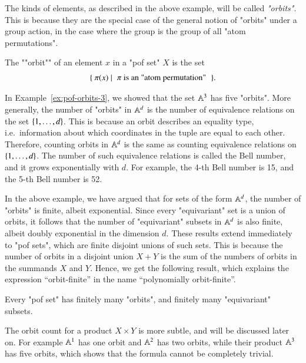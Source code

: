 The kinds of elements, as described in the above example, will be called \emph{"orbits"}. This is because they are the special case of the general notion of "orbits" under a group action, in the case where the group is the  group of all "atom permutations". 

\begin{definition}
    [Orbit]\label{def:orbit-in-pof} The ""orbit"" of an element $x$ in a "pof set" $X$ is the set 
    \begin{align*}
    \setbuild{\pi(x)}{$\pi$ is an "atom permutation"}.
    \end{align*}
\end{definition}

\begin{myexample}\label{ex:how-many-orbits-in-power-of-atoms}
    In Example~\ref{ex:pof-orbits-3}, we showed that the set $\mathbb A^3$ has five "orbits". More generally, the number of "orbits" in $\mathbb A^d$ is the number of equivalence relations on the set $\{1,\ldots,d\}$. This is because an orbit describes an equality type, i.e.~information about which coordinates in the tuple are equal to each other. Therefore, counting orbits in $\mathbb A^d$ is the same as counting equivalence relations on $\{1,\ldots,d\}$.  The number of such equivalence relations  is called the Bell number, and it grows exponentially with $d$. For example, the 4-th Bell number is 15, and the 5-th Bell number is 52.
\end{myexample}

In the above example, we have argued that for sets of the form $\mathbb A^d$, the number of "orbits"  is finite, albeit exponential. Since every "equivariant" set is a union of orbits, it follows that the number of "equivariant" subsets in $\mathbb A^d$ is also finite, albeit doubly exponential in the dimension $d$. These results extend immediately to "pof sets", which are finite disjoint unions of such sets. This is because the number of orbits in a disjoint union $X+Y$ is the sum of the numbers of orbits in the summands $X$ and $Y$.  Hence, we get the following result, which explains the expression ``orbit-finite'' in the name ``polynomially orbit-finite''.
\begin{lemma}\label{lem:pof-finitely-many-equivariant}
    Every "pof set" has finitely many "orbits", and finitely many "equivariant" subsets. 
\end{lemma}

The orbit count for a product $X \times Y$ is more subtle, and will be discussed later on. For example $\mathbb A^1$ has one orbit and $\mathbb A^2$ has two orbits, while their product $\mathbb A^3$ has five orbits, which shows that the formula cannot be completely trivial.


